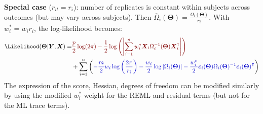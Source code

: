 \documentclass[12pt]{article}
\newcommand{\darkblue}{blue!80!black}
\newcommand{\darkred}{red!50!black}
\newcommand\trans[1]{{#1}^\intercal}%
\newcommand{\param}{\Theta}
\newcommand{\Vparam}{\boldsymbol{\param}}
\newcommand{\VX}{\boldsymbol{X}}
\newcommand{\VY}{\boldsymbol{Y}}
\newcommand{\Vvarepsilon}{\boldsymbol{\varepsilon}}
\begin{document}
\textbf{Special case} (\(r_{it}=r_{i}\)): number of replicates is constant
within subjects across outcomes (but may vary across subjects). Then
\(\overline{\Omega}_{i}(\Vparam) =
\frac{\Omega_i(\Vparam)}{r_{i}}\). With \(w_i^*=w_i r_i\), the log-likelihood becomes:
\begin{align*}
\Likelihood(\Vparam|\VY,\VX) =& \textcolor{\darkred}{ \frac{p}{2} \log(2\pi)-\frac{1}{2} \log\left(\left|\sum_{i=1}^n w^*_i \VX_i \Omega_i^{-1}(\Vparam) \trans{\VX}_i\right|\right)} \notag \\
& + \sum_{i=1}^{n}  \left(\textcolor{\darkblue}{-\frac{m}{2}w_i\log\left(\frac{2\pi}{r_i}\right)- \frac{w_i}{2} \log\left|\Omega_i(\Vparam)\right| - \frac{w_i^*}{2} \Vvarepsilon_i(\Vparam) \Omega_i(\Vparam)^{-1} \trans{\Vvarepsilon_i(\Vparam)}} \right) 
\end{align*}
The expression of the score, Hessian, degrees of freedom can be
modified similarly by using the modified \(w_i^*\) weight for the REML
and residual terms (but not for the ML trace terms).


\clearpage
\end{document}

